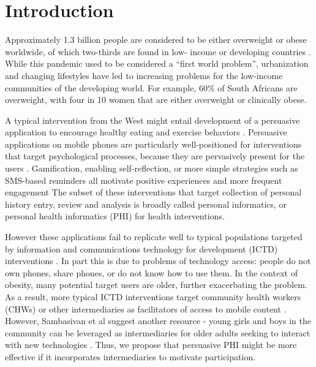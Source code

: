 \documentclass{sig-alternate}
\begin{document}
\section{Introduction} Approximately 1.3 billion people are considered to be
either overweight or obese worldwide, of which two-thirds are found in low-
income or developing countries \cite{Steyn2006}. While this pandemic used to
be considered a ``first world problem'', urbanization and changing lifestyles
have led to increasing problems for the low-income communities of the
developing world. For example, 60\% of South Africans are overweight, with
four in 10 women that are either overweight or clinically
obese\cite{ng:global}.

A typical intervention from the West might entail development of a persuasive
application to encourage healthy eating and exercise behaviors
\cite{arsand:mobile,hamari2014persuasive}.  Persuasive applications on mobile
phones are particularly well-positioned for interventions that target
psychological processes, because they are pervasively present for the users
\cite{hsu2014persuasive}. Gamification, enabling self-reflection, or more
simple strategies such as SMS-based reminders all motivate positive
experiences and more frequent engagement
\cite{hamari2014persuasive,cole2010text} The subset of these interventions
that target collection of personal history entry, review and analysis is
broadly called personal informatics, or personal health informatics (PHI) for
health interventions.

However these applications fail to replicate well to typical populations
targeted by information and communications technology for development (ICTD)
interventions \cite{kaplan2006can}. In part this is due to problems of
technology access: people do not own phones, share phones, or do not know how
to use them.  In the context of obesity, many potential target users are
older, further exacerbating the problem. As a result, more typical ICTD
interventions target community health workers (CHWs) or other intermediaries
as facilitators of access to mobile content
\cite{ramachandran2010mobile,ramachandran2010research,molapo2013software}.
However, Sambasivan et al suggest another resource - young girls and boys in
the community can be leveraged as intermediaries for older adults seeking to
interact with new technologies \cite{sambasivan2010}. Thus, we propose that
persuasive PHI might be more effective if it incorporates intermediaries to
motivate participation.
\end{document}
